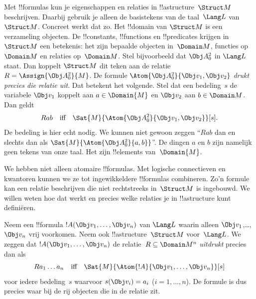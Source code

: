 \documentclass[openany]{memoir}
\begin{document}
\begingroup
\def\olfilename{OLP-0171}
\def\olfilepath{content/first-order-logic/models-theories/}
\hypertarget{unit-OLP-0171}{}





\begin{explain}
Met !!{formula}s kun je eigenschappen en relaties in
!!a{structure}~$\Struct M$ beschrijven. Daarbij gebruik je alleen de
basistekens van de taal~$\Lang L$ van~$\Struct M$. Concreet werkt dat
zo. Het !!{domain} van $\Struct M$ is een verzameling objecten. De
!!{constant}s, !!{function}s en !!{predicate}s krijgen in~$\Struct M$
een betekenis: het zijn bepaalde objecten in~$\Domain M$, functies
op~$\Domain M$ en relaties op~$\Domain M$. Stel bijvoorbeeld dat
$\Obj A^2_0$ in $\Lang L$ staat. Dan koppelt $\Struct M$ dit teken aan
de relatie~$R = \Assign{{\Obj A^2_0}}{M}$. De formule
$\Atom{\Obj A^2_0}{\Obj v_1, \Obj v_2}$ \emph{drukt precies die
relatie uit}. Dat betekent het volgende. Stel dat een bedeling~$s$
de variabele $\Obj v_1$ koppelt aan $a \in \Domain{M}$ en $\Obj v_2$
aan $b \in \Domain M$. Dan geldt
\[
Rab \text{\quad iff\quad} \Sat{M}{\Atom{\Obj A^2_0}{\Obj v_1, \Obj v_2}}[s].
\]
De bedeling is hier echt nodig. We kunnen niet gewoon zeggen ``$Rab$
dan en slechts dan als $\Sat{M}{\Atom{\Obj A^2_0}{a, b}}$''. De dingen
$a$ en $b$ zijn namelijk geen tekens van onze taal. Het zijn
!!{element}s van~$\Domain{M}$.

We hebben niet alleen atomaire !!{formula}s. Met logische connectieven
en kwantoren kunnen we ze tot ingewikkeldere !!{formula}s combineren.
Zo'n formule kan een relatie beschrijven die niet rechtstreeks
in~$\Struct M$ is ingebouwd. We willen weten hoe dat werkt en precies
welke relaties je in !!a{structure} kunt definiëren.
\end{explain}

\begin{defn}
Neem een !!{formula} $!A(\Obj v_1,\dots, \Obj v_n)$ van $\Lang L$
waarin alleen $\Obj v_1$,\dots, $\Obj v_n$ vrij voorkomen. Neem ook
!!a{structure}~$\Struct M$ voor~$\Lang L$. We zeggen dat
$!A(\Obj v_1,\dots, \Obj v_n)$ de relatie~$R \subseteq
\Domain M^n$ \emph{uitdrukt} precies dan als
\[
Ra_1\dots a_n \text{\quad iff\quad} \Sat{M}{\Atom{!A}{\Obj
    v_1,\dots, \Obj v_n}}[s]
\]
voor iedere bedeling~$s$ waarvoor $s(\Obj v_i) = a_i$ ($i = 1,
\dots, n$). De formule is dus precies waar bij de rij objecten die in
de relatie zit.
\end{defn}
\end{document}
